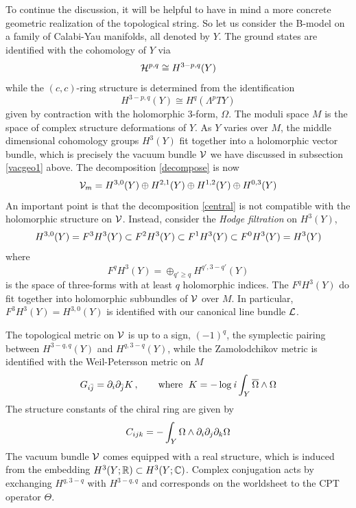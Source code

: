 To continue the discussion, it will be helpful to have in mind a more 
concrete geometric realization of the topological string. So let us 
consider the B-model on a family of Calabi-Yau manifolds, all denoted
by $Y$. The ground states are identified with the cohomology of $Y$ via
\begin{equation}
{\cal H}^{p,q} \cong H^{3-p,q}(Y)
\end{equation}
while the $(c,c)$-ring structure is determined from the identification
\begin{equation}
H^{3-p,q}(Y) \cong H^q(\Lambda^p TY)
\end{equation}
given by contraction with the holomorphic 3-form, $\Omega$. The moduli
space $M$ is the space of complex structure deformations of $Y$. As $Y$
varies over $M$, the middle dimensional cohomology groups $H^3(Y)$
fit together into a holomorphic vector bundle, which is precisely the
vacuum bundle ${\cal V}$ we have discussed in subsection \ref{vacgeo1} 
above. The decomposition \eqref{decompose} is now
\begin{equation}
\eqlabel{central}
\calv_m = H^{3,0}(Y) \oplus H^{2,1}(Y)\oplus H^{1,2}(Y) \oplus H^{0,3}(Y)
\end{equation}
An important point is that the decomposition \eqref{central} is not compatible
with the holomorphic structure on ${\cal V}$. Instead, consider the {\it Hodge 
filtration} on $H^3(Y)$,
\begin{equation}
\eqlabel{filtration}
H^{3,0}(Y)=F^3H^3(Y)\subset F^2H^3(Y)\subset F^1H^3(Y)\subset F^0 H^3(Y)=H^3(Y)
\end{equation}
where
\begin{equation}
F^qH^3(Y) = \oplus_{q'\ge q} H^{q',3-q'}(Y) 
\end{equation}
is the space of three-forms with at least $q$ holomorphic indices. The
$F^qH^3(Y)$ do fit together into holomorphic subbundles of ${\cal V}$ over
$M$. In particular, $F^3H^3(Y)=H^{3,0}(Y)$ is identified with our
canonical line bundle ${\cal L}$.

The topological metric on ${\cal V}$ is up to a sign, $(-1)^q$, the symplectic 
pairing between $H^{3-q,q}(Y)$ and $H^{q,3-q}(Y)$, while the Zamolodchikov 
metric is identified with the Weil-Petersson metric on $M$
\begin{equation}
\eqlabel{g00}
G_{i\jb} = \del_i\del_\jb K\,,\qquad\text{where } \;
K = -\log \ii\int_Y\Omegab\wedge\Omega
\end{equation}
The structure constants of the chiral ring are given by
\begin{equation}
\eqlabel{structure}
C_{ijk} = - \int_Y \Omega\wedge\del_i\del_j\del_k\Omega
\end{equation}
The vacuum bundle ${\cal V}$ comes equipped with a real structure, which
is induced from the embedding $H^3(Y;{\mathbb R})\subset H^3(Y;{\mathbb C})$.
Complex conjugation acts by exchanging $H^{q,3-q}$ with $H^{3-q,q}$
and corresponds on the worldsheet to the CPT operator $\Theta$. 

